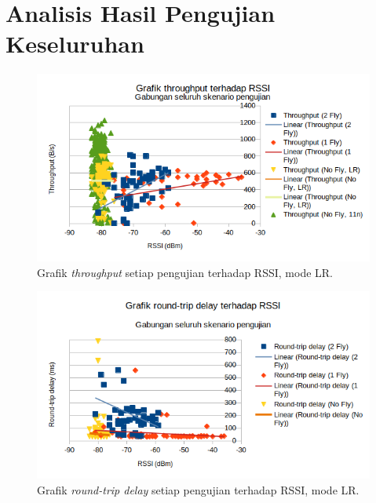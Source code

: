 \section{Analisis Hasil Pengujian Keseluruhan}
\begin{figure}[H]
	\centering
	\includegraphics[scale=0.7]{./assets/Graphs/GabunganThroughput}
	\caption{Grafik \textit{throughput} setiap pengujian terhadap RSSI, mode LR.}
\end{figure}
\begin{figure}[H]
	\centering
	\includegraphics[scale=0.7]{./assets/Graphs/GabunganDelay}
	\caption{Grafik \textit{round-trip delay} setiap pengujian terhadap RSSI, mode LR.}
\end{figure}

